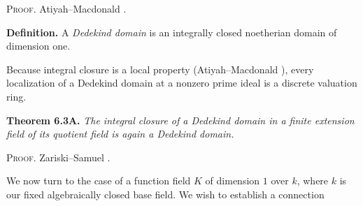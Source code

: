 {\smallskip
\noindent\textsc{Proof.} Atiyah--Macdonald .

\smallskip
\noindent\textbf{Definition.} A \emph{Dedekind domain} is an integrally closed noetherian domain of dimension one.

\smallskip
Because integral closure is a local property (Atiyah--Macdonald ), every localization of a Dedekind domain at a nonzero prime ideal is a discrete valuation ring.

\smallskip
\noindent\hypertarget{result-I-6.3A}{}\textbf{Theorem 6.3A.} \emph{The integral closure of a Dedekind domain in a finite extension field of its quotient field is again a Dedekind domain.}

\smallskip
\noindent\textsc{Proof.} Zariski--Samuel .

\smallskip
We now turn to the case of a function field $K$ of dimension $1$ over $k$, where $k$ is our fixed algebraically closed base field. We wish to establish a connection}
